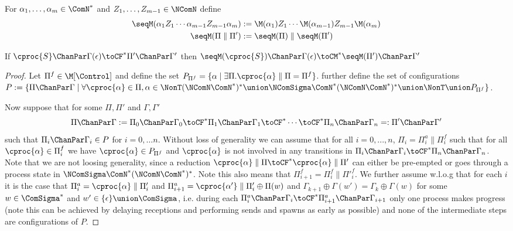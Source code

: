 For $\alpha_1,\ldots,\alpha_m \in \ComN^*$ and $Z_1,\ldots, Z_{m-1} \in \NComN$ define
\begin{align*}
\seqM(\alpha_1 Z_1\cdots \alpha_{m-1}Z_{m-1}\alpha_m) &:= \M(\alpha_1)Z_1 \cdots \M(\alpha_{m-1})Z_{m-1}\M(\alpha_m)\\
\seqM(\Pi \parallel \Pi') &:= \seqM(\Pi) \parallel \seqM(\Pi')
\end{align*}

\begin{proposition}\label{apx:prop:conc_reduction_simulation}
If $\cproc{S} \ChanPar \Gamma(\epsilon) \toCF^* \Pi' \ChanPar \Gamma'$
then $\seqM(\cproc{S}) \ChanPar \Gamma(\epsilon) \toCM^* \seqM(\Pi') \ChanPar \Gamma'$
\end{proposition}
\begin{proof}
Let $\Pi^f \in \M[\Control]$ and define the set
$P_{\Pi^f} = \{ \alpha \mid \exists \Pi. \cproc{\alpha} \parallel \Pi = \Pi^f \}$.
further define the set of configurations
$P := \{ \Pi \ChanPar \Gamma \mid \forall \cproc{\alpha} \in \Pi, \alpha \in \NonT(\NComN\ComN^*)^* \union \NComSigma\ComN^*(\NComN\ComN^*)^* \union \NonT \union P_{\Pi^f}\}$.

Now suppose that for some $\Pi, \Pi'$ and $\Gamma, \Gamma'$
$$\Pi \ChanPar \Gamma := \Pi_0 \ChanPar \Gamma_0 \toCF^* 
  \Pi_1 \ChanPar \Gamma_1 \toCF^* \cdots \toCF^* \Pi_n \ChanPar \Gamma_n =: \Pi' \ChanPar \Gamma'$$ 
such that $\Pi_i \ChanPar \Gamma_i \in P$ for $i = 0,\ldots n$. Without loss of generality we can assume that for all $i = 0,...,n$, $\Pi_i = \Pi_i^a \parallel \Pi_i^f$ such that for all 
$\cproc{\alpha} \in \Pi_i^f$ we have $\cproc{\alpha} \in P_{\Pi^f}$ and 
$\cproc{\alpha}$ is not involved in any transitions in 
$\Pi_i \ChanPar \Gamma_i \toCF^* \Pi_n \ChanPar \Gamma_n$. 
Note that we are not loosing generality, since a reduction 
$\cproc{\alpha} \parallel \Pi \toCF^* \cproc{\alpha} \parallel \Pi'$ can either be pre-empted or goes through a process state in $\NComSigma\ComN^*(\NComN\ComN^*)^*$. 
Note this also means that $\Pi_{i+1}^f = \Pi_{i}^f \parallel {\Pi'}_{i}^f$. We further assume w.l.o.g that for each $i$ it is the case that 
$\Pi^a_i = \cproc{\alpha} \parallel \Pi'_i$ and $\Pi^a_{i+1} = \cproc{\alpha'} \parallel \Pi'_i \oplus \Pi(w)$ 
and $\Gamma_{k+1} \oplus \Gamma(w') = \Gamma_k \oplus \Gamma(w)$ 
for some $w \in \ComSigma^*$ and $w' \in \{\epsilon\} \union \ComSigma$,
i.e. during each $\Pi^a_i \ChanPar \Gamma_i \toCF^* \Pi^a_{i+1} \ChanPar \Gamma_{i+1}$ only one process makes progress (note this can be achieved by delaying receptions and performing sends and spawns as early as possible) and none of the intermediate steps are configurations of $P$.


\end{proof}
